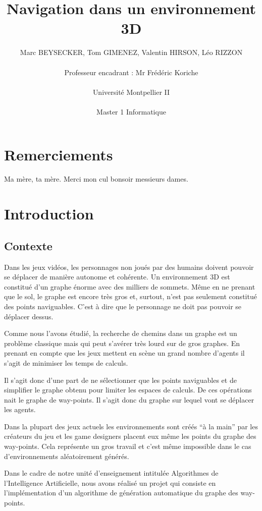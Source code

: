 \documentclass[a4paper,12pt]{report}
\title{Navigation dans un environnement 3D \vspace{0.5cm}}
\author{Marc BEYSECKER, Tom GIMENEZ, Valentin HIRSON, Léo RIZZON\\  \\Professeur encadrant : Mr Frédéric Koriche \\ \\Université Montpellier II \\  \\Master 1 Informatique}
\date{}
\begin{document}
\maketitle

\tableofcontents

\newpage

\chapter{Remerciements}

Ma mère, ta mère. Merci mon cul bonsoir messieurs dames.

\chapter{Introduction}


\section*{Contexte}

Dans les jeux vidéos, les personnages non joués par des humains doivent pouvoir se déplacer de manière autonome et cohérente. Un environnement 3D est constitué d'un graphe énorme avec des milliers de sommets. Même en ne prenant que le sol, le graphe est encore très gros et, surtout, n'est pas seulement constitué des points naviguables. C'est à dire que le personnage ne doit pas pouvoir se déplacer dessus.

Comme nous l'avons étudié, la recherche de chemins dans un graphe est un problème classique mais qui peut s'avérer très lourd sur de gros graphes. En prenant en compte que les jeux mettent en scène un grand nombre d'agents il s'agit de minimiser les temps de calculs. 

Il s'agit donc d'une part de ne sélectionner que les points naviguables et de simplifier le graphe obtenu pour limiter les espaces de calculs. De ces opérations nait le graphe de way-points. Il s'agit donc du graphe sur lequel vont se déplacer les agents.

Dans la plupart des jeux actuels les environnements sont créés ``à la main'' par les créateurs du jeu et les game designers placent eux même les points du graphe des way-points. Cela représente un gros travail et c'est même impossible dans le cas d'environnements aléatoirement générés.

Dans le cadre de notre unité d'enseignement intitulée Algorithmes de l'Intelligence Artificielle, nous avons réalisé un projet qui consiste en l'implémentation d'un algorithme de génération automatique du graphe des way-points.
\end{document}
